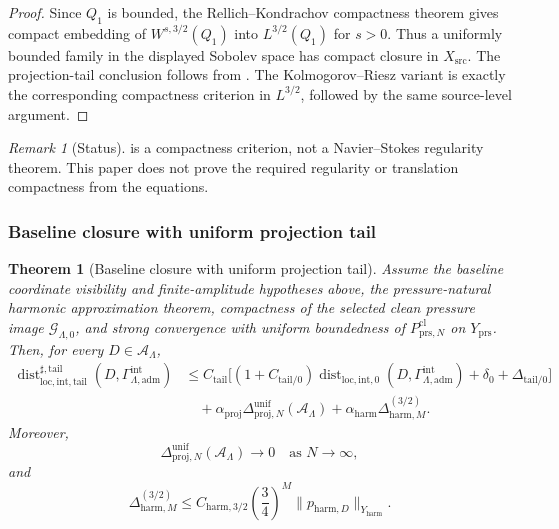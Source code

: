 \documentclass[11pt]{article}
\numberwithin{equation}{section}
\newtheorem{theorem}{Theorem}[section]
\theoremstyle{definition}
\theoremstyle{remark}
\newtheorem{remark}[remark]{Remark}
\newcommand{\loc}{\mathrm{loc}}
\newcommand{\intg}{\mathrm{int}}
\newcommand{\tail}{\mathrm{tail}}
\newcommand{\adm}{\mathrm{adm}}
\newcommand{\prs}{\mathrm{prs}}
\newcommand{\proj}{\mathrm{proj}}
\newcommand{\harm}{\mathrm{harm}}
\newcommand{\src}{\mathrm{src}}
\newcommand{\cl}{\mathrm{cl}}
\newcommand{\Dist}{\operatorname{dist}}
\newcommand{\Gammaadm}{\Gamma^{\intg}_{\Lambda,\adm}}
\begin{document}
\begin{proof}
Since \(Q_1\) is bounded, the Rellich--Kondrachov compactness theorem gives
compact embedding of \(W^{s,3/2}(Q_1)\) into \(L^{3/2}(Q_1)\) for
\(s>0\).  Thus a uniformly bounded family in the displayed Sobolev space has
compact closure in \(X_{\src}\).  The projection-tail conclusion follows from
.  The Kolmogorov--Riesz variant
is exactly the corresponding compactness criterion in \(L^{3/2}\), followed
by the same source-level argument.
\end{proof}

\begin{remark}[Status]
 is a compactness criterion, not
a Navier--Stokes regularity theorem.  This paper does not prove the
required regularity or translation compactness from the equations.
\end{remark}

\subsubsection{Baseline closure with uniform projection tail}

\begin{theorem}[Baseline closure with uniform projection tail]
\label{thm:baseline-closure-uniform-projection-tail}
Assume the baseline coordinate visibility and finite-amplitude hypotheses
above, the pressure-natural harmonic approximation
theorem, compactness of the selected clean pressure image
\(\mathcal G_{\Lambda,0}\), and strong convergence with uniform boundedness
of \(P^{\cl}_{\prs,N}\) on \(Y_{\prs}\).  Then, for every
\(D\in\mathcal A_\Lambda\),
\[
\begin{aligned}
    \Dist^{\sharp,\tail}_{\loc,\intg,\tail}(D,\Gammaadm)
    &\le
    C_{\tail}
    \bigl[
        (1+C_{\tail/0})
        \Dist_{\loc,\intg,0}(D,\Gammaadm)
        +
        \delta_0
        +
        \Delta_{\tail/0}
    \bigr]
\\
    &\quad
    +
    \alpha_{\proj}
    \Delta^{\mathrm{unif}}_{\proj,N}(\mathcal A_\Lambda)
    +
    \alpha_{\harm}\Delta_{\harm,M}^{(3/2)}.
\end{aligned}
\]
Moreover,
\[
    \Delta^{\mathrm{unif}}_{\proj,N}(\mathcal A_\Lambda)\to0
    \quad\text{as }N\to\infty,
\]
and
\[
    \Delta_{\harm,M}^{(3/2)}
    \le
    C_{\harm,3/2}
    \left(\frac34\right)^M
    \|p_{\harm,D}\|_{Y_{\harm}}.
\]
\end{theorem}
\end{document}
